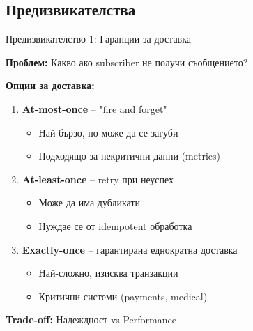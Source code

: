 \documentclass[aspectratio=169]{beamer}
\begin{document}
\subsection{Предизвикателства}

\begin{frame}{Предизвикателство 1: Гаранции за доставка}

\textbf{Проблем:} Какво ако subscriber не получи съобщението?

\vspace{0.3cm}

\textbf{Опции за доставка:}
\begin{enumerate}
    \item \textbf{At-most-once} – "fire and forget"
    \begin{itemize}
        \item Най-бързо, но може да се загуби
        \item Подходящо за некритични данни (metrics)
    \end{itemize}
    
    \item \textbf{At-least-once} – retry при неуспех
    \begin{itemize}
        \item Може да има дубликати
        \item Нуждае се от idempotent обработка
    \end{itemize}
    
    \item \textbf{Exactly-once} – гарантирана еднократна доставка
    \begin{itemize}
        \item Най-сложно, изисква транзакции
        \item Критични системи (payments, medical)
    \end{itemize}
\end{enumerate}

\vspace{0.3cm}
\textbf{Trade-off:} Надеждност vs Performance
\end{frame}
\end{document}
